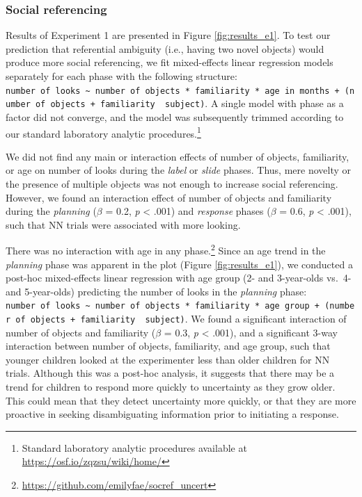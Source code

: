\documentclass[a4paper,man,apacite,floatsintext]{apa6}
\begin{document}
\subsubsection{Social referencing}\label{social-referencing}

Results of Experiment 1 are presented in Figure \ref{fig:results_e1}. To
test our prediction that referential ambiguity (i.e., having two novel
objects) would produce more social referencing, we fit mixed-effects
linear regression models separately for each phase with the following
structure:
\texttt{number\ of\ looks\ \textasciitilde{}\ number\ of\ objects\ *\ familiarity\ *\ age\ in\ months\ +\ (number\ of\ objects\ +\ familiarity\ \textbar{}\ subject)}.
A single model with phase as a factor did not converge, and the model
was subsequently trimmed according to our standard laboratory analytic
procedures.\footnote{Standard laboratory analytic procedures available
  at \url{https://osf.io/zqzsu/wiki/home/}}

We did not find any main or interaction effects of number of objects,
familiarity, or age on number of looks during the \emph{label} or
\emph{slide} phases. Thus, mere novelty or the presence of multiple
objects was not enough to increase social referencing. However, we found
an interaction effect of number of objects and familiarity during the
\emph{planning} (\(\beta\) = 0.2, \emph{p} \textless{} .001) and
\emph{response} phases (\(\beta\) = 0.6, \emph{p} \textless{} .001),
such that NN trials were associated with more looking.

There was no interaction with age in any phase.\footnote{\url{https://github.com/emilyfae/socref_uncert}}
Since an age trend in the \emph{planning} phase was apparent in the plot
(Figure \ref{fig:results_e1}), we conducted a post-hoc mixed-effects
linear regression with age group (2- and 3-year-olds vs.~4- and
5-year-olds) predicting the number of looks in the \emph{planning}
phase:
\texttt{number\ of\ looks\ \textasciitilde{}\ number\ of\ objects\ *\ familiarity\ *\ age\ group\ +\ (number\ of\ objects\ +\ familiarity\ \textbar{}\ subject)}.
We found a significant interaction of number of objects and familiarity
(\(\beta\) = 0.3, \emph{p} \textless{} .001), and a significant 3-way
interaction between number of objects, familiarity, and age group, such
that younger children looked at the experimenter less than older
children for NN trials. Although this was a post-hoc analysis, it
suggests that there may be a trend for children to respond more quickly
to uncertainty as they grow older. This could mean that they detect
uncertainty more quickly, or that they are more proactive in seeking
disambiguating information prior to initiating a response.
\end{document}
